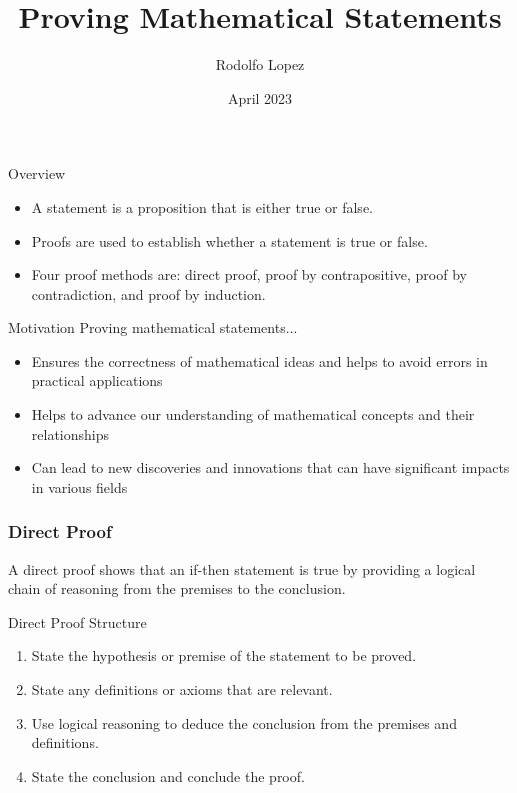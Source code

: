 \documentclass{beamer}
\title[Proving Mathematical Statements]{Proving Mathematical Statements}
\author[Rodolfo Lopez]{Rodolfo Lopez}
\date[April 2023]{April 2023}
\begin{document}
\begin{frame}
\titlepage
\end{frame}

\begin{frame}{Overview}
\begin{itemize}
    \item<1-> A statement is a proposition that is either true or false.
    \pause
    \item<2-> Proofs are used to establish whether a statement is true or false. 
    \pause
    \item<3-> Four proof methods are: direct proof, proof by contrapositive, proof by contradiction, and proof by induction. 
\end{itemize}
\end{frame}

\begin{frame}{Motivation}
Proving mathematical statements...
\pause
\begin{itemize}
    \item<1-> Ensures the correctness of mathematical ideas and helps to avoid errors in practical applications
    \pause
    \item<2-> Helps to advance our understanding of mathematical concepts and their relationships
    \pause
    \item<3-> Can lead to new discoveries and innovations that can have significant impacts in various fields
\end{itemize}
\end{frame}

\begin{frame}
\frametitle{Direct Proof}
A direct proof shows that an if-then statement is true by providing a logical chain of reasoning from the premises to the conclusion.
\end{frame}

\begin{frame}{Direct Proof Structure}
\begin{enumerate}
    \item<1-> State the hypothesis or premise of the statement to be proved.
    \pause
    \item<2-> State any definitions or axioms that are relevant.
    \pause
    \item<3-> Use logical reasoning to deduce the conclusion from the premises and definitions.
    \pause
    \item<4-> State the conclusion and conclude the proof.
\end{enumerate}
\end{frame}
\end{document}

